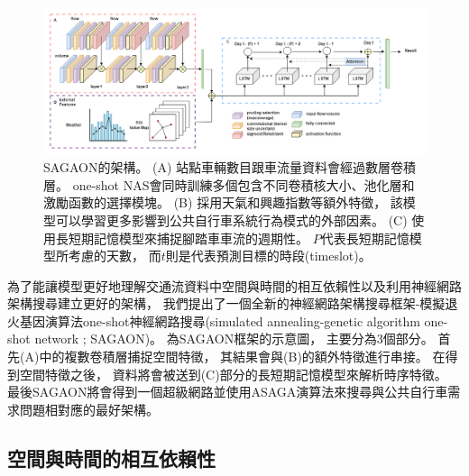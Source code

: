 \documentclass[a4paper,14pt]{extarticle}
\begin{document}
        \begin{figure}[h]
            \includegraphics[width=\textwidth]{SAGAON.png}
            \caption{
                {\fontsize{12pt}{10pt}\selectfont
                    SAGAON的架構。
                    (A) 站點車輛數目跟車流量資料會經過數層卷積層。
                    one-shot NAS會同時訓練多個包含不同卷積核大小、池化層和激勵函數的選擇模塊。
                    (B) 採用天氣和興趣指數等額外特徵，
                    該模型可以學習更多影響到公共自行車系統行為模式的外部因素。
                    (C) 使用長短期記憶模型來捕捉腳踏車車流的週期性。
                    $P$代表長短期記憶模型所考慮的天數，
                    而$t$則是代表預測目標的時段(timeslot)。
                }
            }
            \label{fig:SAGAON}
        \end{figure}

        為了能讓模型更好地理解交通流資料中空間與時間的相互依賴性以及利用神經網路架構搜尋建立更好的架構，
        我們提出了一個全新的神經網路架構搜尋框架-模擬退火基因演算法one-shot神經網路搜尋(simulated annealing-genetic algorithm one-shot network ; SAGAON)。
        為SAGAON框架的示意圖，
        主要分為3個部分。
        首先(A)中的複數卷積層捕捉空間特徵，
        其結果會與(B)的額外特徵進行串接。
        在得到空間特徵之後，
        資料將會被送到(C)部分的長短期記憶模型來解析時序特徵。
        最後SAGAON將會得到一個超級網路並使用ASAGA演算法來搜尋與公共自行車需求問題相對應的最好架構。
        
        \subsection{空間與時間的相互依賴性}
            
\end{document}
